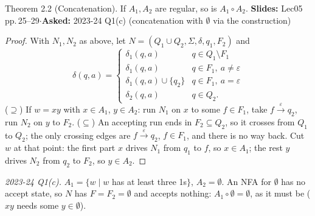 \documentclass[10.5pt,a4paper]{article}
\newcommand{\src}[2]{{\footnotesize\color{gray!70!black}\textbf{Slides:} #1\enspace$\cdot$\enspace\textbf{Asked:} #2}\par}
\newcommand{\eps}{\varepsilon}
\begin{document}
\begin{thm}{Theorem 2.2 (Concatenation). If $A_1,A_2$ are regular, so is $A_1\circ A_2$.}
\src{Lec05 pp.\,25--29}{2023-24 Q1(c) (concatenation with $\emptyset$ via the construction)}
\end{thm}
\begin{proof}
With $N_1,N_2$ as above, let $N=(Q_1\cup Q_2,\Sigma,\delta,q_1,F_2)$ and
\[\delta(q,a)=\begin{cases}
\delta_1(q,a) & q\in Q_1\setminus F_1\\
\delta_1(q,a) & q\in F_1,\ a\neq\eps\\
\delta_1(q,a)\cup\{q_2\} & q\in F_1,\ a=\eps\\
\delta_2(q,a) & q\in Q_2.
\end{cases}\]
($\supseteq$) If $w=xy$ with $x\in A_1$, $y\in A_2$: run $N_1$ on $x$ to some $f\in F_1$, take $f\xrightarrow{\eps}q_2$, run $N_2$ on $y$ to
$F_2$. ($\subseteq$) An accepting run ends in $F_2\subseteq Q_2$, so it crosses from $Q_1$ to $Q_2$; the only crossing edges are
$f\xrightarrow{\eps}q_2$, $f\in F_1$, and there is no way back. Cut $w$ at that point: the first part $x$ drives $N_1$ from $q_1$ to $f$, so
$x\in A_1$; the rest $y$ drives $N_2$ from $q_2$ to $F_2$, so $y\in A_2$.
\end{proof}
\emph{2023-24 Q1(c).} $A_1=\{w\mid w$ has at least three 1s$\}$, $A_2=\emptyset$. An NFA for $\emptyset$ has no accept state, so $N$ has
$F=F_2=\emptyset$ and accepts nothing: $A_1\circ\emptyset=\emptyset$, as it must be ($xy$ needs some $y\in\emptyset$).
\end{document}
